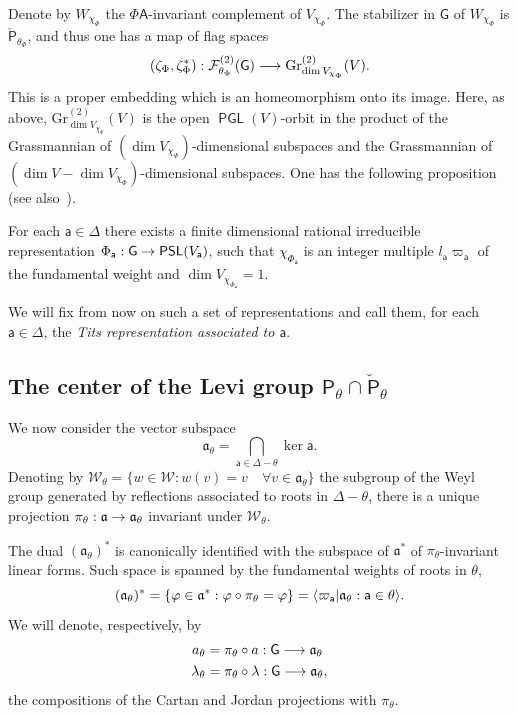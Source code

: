 \documentclass[AHL,Unicode,longabstracts,MathTools]{cedram}
\newcommand{\grass}{\mathrm{Gr}}
\newcommand{\cartan}{a}
\DeclareMathOperator{\PSL}{{\mathsf{PSL}}}
\DeclareMathOperator{\PGL}{{\mathsf{PGL}}}
\renewcommand{\sf}[1]{{\mathsf{#1}}}
\newcommand{\sroot}{{\sf{a}}}
\newcommand{\sfG}{\sf{G}}
\newcommand{\cal}{\mathcal}
\newcommand{\Weyl}{\cal{W}}
\newcommand{\calF}{\mathcal{F}}
\renewcommand{\t}{\theta}
\newcommand{\wk}{\check}
\newcommand{\simple}{{\sf \Delta}}
\newcommand{\Fund}{\Phi}
\newcommand{\peso}{\varpi}
\renewcommand{\/}{\backslash}
\newcommand{\<}{\langle}
\renewcommand{\>}{\rangle}
\renewcommand{\a}{\mathfrak{a}}
\renewcommand*{\to}{\mathchoice{\longrightarrow}{\rightarrow}{\rightarrow}{\rightarrow}}
\let\originalleft\left
\let\originalright\right
\renewcommand{\left}{\mathopen{}\mathclose\bgroup\originalleft}
\renewcommand{\right}{\aftergroup\egroup\originalright}
\let\oldforall\forall
\renewcommand*{\forall}{\mathrel{\oldforall}}
\begin{document}
Denote by $W_{\chi_\Fund}$ the $\Fund\sf A $-invariant complement of $V_{\chi_\Fund}$. The stabilizer in $\sfG $ of $W_{\chi_\Fund}$ is $\wk{\sf P}_{\t_\Fund}$, and thus one has a map of flag spaces
\begin{equation}\label{maps}
(\zeta_\Fund,\zeta^*_\Fund):\calF_{\t_\Fund}^{(2)}(\sfG)\to \grass_{\dim V_{\chi_\Fund}}^{(2)}(V).
\end{equation}
This is a proper embedding which is an homeomorphism onto its image. Here, as above, $\grass_{\dim V_{\chi_\Fund}}^{(2)}(V)$ is the open $\PGL (V)$-orbit in the product of the Grassmannian of $(\dim V_{\chi_\Fund})$-dimensional subspaces and the Grassmannian of $(\dim V-\dim V_{\chi_\Fund})$-dimensional subspaces. One has the following proposition (see also~\cite[Chapter~XI]{LAG}).

\begin{prop}\label{prop:titss}
For each $\sroot\in\simple$ there exists a finite dimensional rational irreducible representation $\Fund_\sroot:\sfG\to\PSL(V_\sroot)$, such that $\chi_{\Fund_\sroot}$ is an integer multiple $l_\sroot\peso_\sroot$ of the fundamental weight and $\dim V_{\chi_{\Fund_\sroot}}=1$.
\end{prop}


We will fix from now on such a set of representations and call them, for each $\sroot\in\simple$, the \emph{Tits representation associated to $\sroot$}.

\subsection{The center of the Levi group \texorpdfstring{$\sf P_{\t}\cap\check{\sf P}_{\t}$}{sf P\_ t cap check sf P\_ t}}\label{s.Levi}


We now consider the vector subspace
\[
\a_\t=\bigcap_{\sroot\in\simple-\t}\ker\sroot.
\]
Denoting by $\Weyl_\t=\{w\in \Weyl:w(v)=v\quad \forall v\in\a_\t\}$ the subgroup of the Weyl group generated by reflections associated to roots in $\simple-\t$, there is a unique projection $\pi_\t:\a\to\a_\t$ invariant under $\Weyl_\t$.

The dual $(\a_\t)^*$ is canonically identified with the subspace of $\a^*$ of $\pi_\t$-invariant linear forms. Such space is spanned by the fundamental weights of roots in $\t$,
\[
(\a_\t)^*=\left\{\varphi\in\a^*:\varphi\circ\pi_\t=\varphi
\right\}=\left\<\peso_\sroot|\a_\t:\sroot\in\t\right\>.
\]
We will denote, respectively, by
\begin{alignat*}{2}\cartan_\t& =\pi_\t\circ \cartan:\sfG\to \a_\t\ \\ \lambda_\t & =\pi_\t\circ\lambda:\sfG\to \a_\t,
\end{alignat*} the compositions of the Cartan and Jordan projections with $\pi_\t$.
\end{document}
